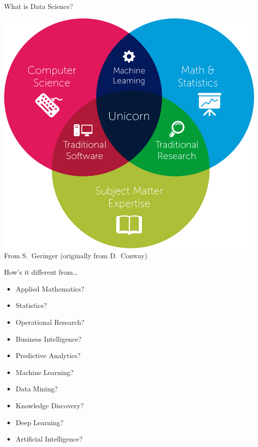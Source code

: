 \begin{frame}{What is Data Science?}
    \begin{center}
        \includegraphics[height=0.8\textheight]{figures/data_science_venn_diagram} \\
        {\scriptsize%
         From S.\ Geringer (originally from D.\ Conway)}
    \end{center}
\end{frame}

{
\begin{frame}{How's it different from\ldots}
    \begin{itemize}
        \item Applied Mathematics?
        \item Statistics?
        \item Operational Research?
        \item Business Intelligence?
        \item Predictive Analytics?
        \item Machine Learning?
        \item Data Mining?
        \item Knowledge Discovery?
        \item Deep Learning?
        \item Artificial Intelligence?
    \end{itemize}
\end{frame}}

